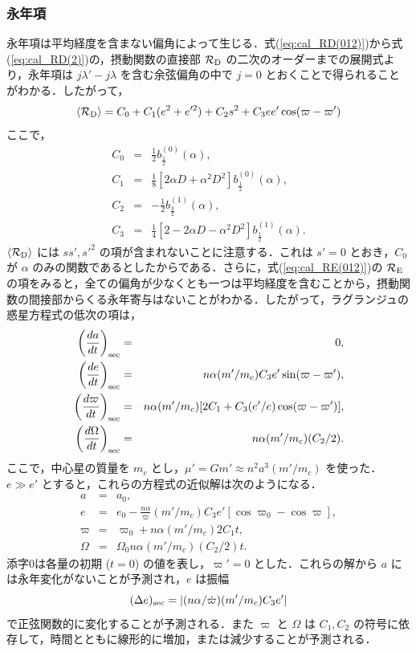 \documentclass[11pt,a4paper,oneside,onecolumn]{jreport}
\begin{document}
\subsubsection{永年項}
永年項は平均経度を含まない偏角によって生じる．式(\ref{eq:cal_RD(012)})から式(\ref{eq:cal_RD(2)})の，摂動関数の直接部 ${\cal R}_{\rm D}$ の二次のオーダーまでの展開式より，永年項は $j \lambda' - j \lambda$ を含む余弦偏角の中で $j = 0$ とおくことで得られることがわかる．したがって，
\begin{equation}
\langle {\cal R}_{\rm D} \rangle = C_0 + C_1 (e^2 + e'^2) + C_2 s^2 + C_3 e e' \cos (\varpi - \varpi')
\end{equation}
ここで，
\begin{eqnarray}
C_0 & = & \frac{1}{2} b_{\frac{1}{2}}^{(0)} (\alpha), \\
C_1 & = & \frac{1}{8} [ 2 \alpha D + \alpha^2 D^2 ] b_{\frac{1}{2}}^{(0)} (\alpha), \\
C_2 & = & - \frac{1}{2} b_{\frac{3}{2}}^{(1)} (\alpha), \\
C_3 & = & \frac{1}{4} [ 2 - 2 \alpha D - \alpha^2 D^2 ] b_{\frac{1}{2}}^{(1)} (\alpha).
\end{eqnarray}
$\langle {\cal R}_{\rm D} \rangle$ には $s s', s'^2$ の項が含まれないことに注意する．これは $s' = 0$ とおき，$C_0$ が $\alpha$ のみの関数であるとしたからである．さらに，式(\ref{eq:cal_RE(012)})の ${\cal R}_{\rm E}$ の項をみると，全ての偏角が少なくとも一つは平均経度を含むことから，摂動関数の間接部からくる永年寄与はないことがわかる．したがって，ラグランジュの惑星方程式の低次の項は，
\begin{eqnarray}
\left( \frac{d a}{d t} \right)_{\rm sec} & = & 0, \\
\left( \frac{d e}{d t} \right)_{\rm sec} & = & n \alpha (m' / m_c) C_3 e' \sin (\varpi - \varpi'), \\
\left( \frac{d \varpi}{d t} \right)_{\rm sec} & = & n \alpha (m' / m_c) [2 C_1 + C_3 (e' / e) \cos (\varpi - \varpi') ], \\
\left( \frac{d \Omega}{d t} \right)_{\rm sec} & = & n \alpha (m' / m_c) (C_2 / 2).
\end{eqnarray}
ここで，中心星の質量を $m_c$ とし，$\mu' = G m' \approx n^2 a^3 (m' / m_c)$ を使った．$e \gg e'$ とすると，これらの方程式の近似解は次のようになる．
\begin{eqnarray}
a & = & a_0, \\
e & = & e_0 - \frac{n \alpha}{\dot{\varpi}} (m' / m_c) C_3 e' [\cos \varpi_0 - \cos \varpi], \\
\varpi & = & \varpi_0 + n \alpha (m' / m_c) 2 C_1 t, \\
\Omega & = & \Omega_0 n \alpha (m' / m_c) (C_2 / 2) t.
\end{eqnarray}
添字0は各量の初期 ($t = 0$) の値を表し，$\varpi' = 0$ とした．これらの解から $a$ には永年変化がないことが予測され，$e$ は振幅
\begin{equation}
(\Delta e)_{\rm sec} = | (n \alpha /\dot{\varpi}) (m' / m_c) C_3 e' |
\end{equation}
で正弦関数的に変化することが予測される．また $\varpi$ と $\Omega$ は $C_1, C_2$ の符号に依存して，時間とともに線形的に増加，または減少することが予測される．
\end{document}
